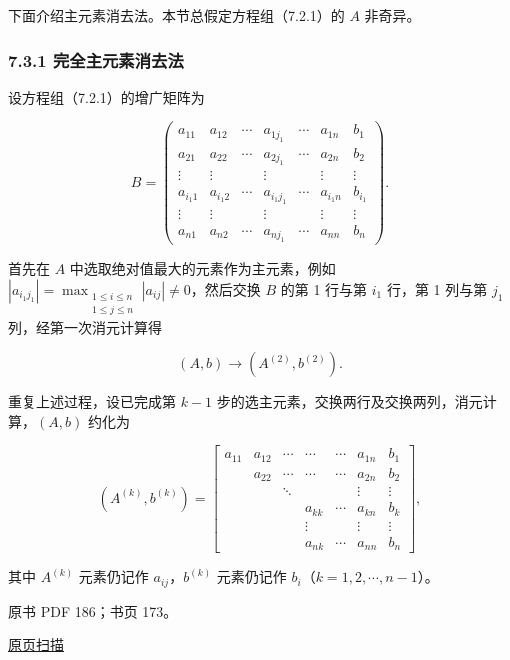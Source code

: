 \documentclass[
  10pt,
  fontset=fandol]{ctexart}
\begin{document}
下面介绍主元素消去法。本节总假定方程组（7.2.1）的 \(A\) 非奇异。

\subsubsection{7.3.1 完全主元素消去法}\label{ux5b8cux5168ux4e3bux5143ux7d20ux6d88ux53bbux6cd5}

设方程组（7.2.1）的增广矩阵为

\[
B=\left(\begin{array}{cccccc|c}
a_{11}&a_{12}&\cdots&a_{1j_1}&\cdots&a_{1n}&b_1\\
a_{21}&a_{22}&\cdots&a_{2j_1}&\cdots&a_{2n}&b_2\\
\vdots&\vdots&&\vdots&&\vdots&\vdots\\
a_{i_1 1}&a_{i_1 2}&\cdots&a_{i_1j_1}&\cdots&a_{i_1 n}&b_{i_1}\\
\vdots&\vdots&&\vdots&&\vdots&\vdots\\
a_{n1}&a_{n2}&\cdots&a_{nj_1}&\cdots&a_{nn}&b_n
\end{array}\right).
\]

首先在 \(A\) 中选取绝对值最大的元素作为主元素，例如 \(|a_{i_1j_1}|=\max_{\substack{1\le i\le n\\1\le j\le n}}|a_{ij}|\ne0\)，然后交换 \(B\) 的第 1 行与第 \(i_1\) 行，第 1 列与第 \(j_1\) 列，经第一次消元计算得

\[(A,b)\to(A^{(2)},b^{(2)}).\]

重复上述过程，设已完成第 \(k-1\) 步的选主元素，交换两行及交换两列，消元计算，\((A,b)\) 约化为

\[
(A^{(k)},b^{(k)})=\left[\begin{array}{cccccc|c}
a_{11}&a_{12}&\cdots&\cdots&\cdots&a_{1n}&b_1\\
&a_{22}&\cdots&\cdots&\cdots&a_{2n}&b_2\\
&&\ddots&&&\vdots&\vdots\\
&&&a_{kk}&\cdots&a_{kn}&b_k\\
&&&\vdots&&\vdots&\vdots\\
&&&a_{nk}&\cdots&a_{nn}&b_n
\end{array}\right],
\]

其中 \(A^{(k)}\) 元素仍记作 \(a_{ij}\)，\(b^{(k)}\) 元素仍记作 \(b_i\)（\(k=1,2,\cdots,n-1\)）。

\clearpage

原书 PDF 186；书页 173。

\href{/Users/xiangjunfeng/Desktop/数值计算专用/numerical-analysis/book/source-images/pdf-186.jpeg}{原页扫描}
\end{document}
